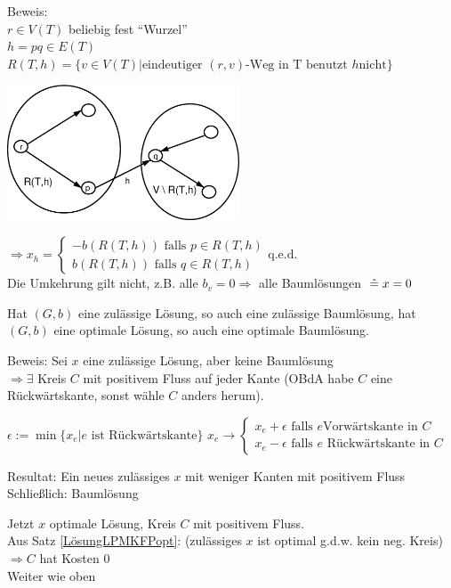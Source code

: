 Beweis:\\
$r \in V(T)$ beliebig fest "`Wurzel"'\\
$h=p q \in E(T)$\\
$R(T,h) = \{v \in V(T) | \mbox{eindeutiger $(r,v)$-Weg in T benutzt $h$
nicht}\}$

\includegraphics[height=4cm]{bilder/4-2BeweisL47}

$\Rightarrow x_{h} = \left\{\begin{array}{ll}-b(R(T,h)) \mbox{ falls } p
\in R(T,h)\\ b(R(T,h)) \mbox{ falls } q \in R(T,h)\end{array}\right.
\mbox{q.e.d.}$\\
Die Umkehrung gilt nicht, z.B. alle $b_{v} = 0 \Rightarrow$ alle
Baumlösungen $\; \hat{=}\; x=0$

\begin{satz}
Hat $(G,b)$ eine zulässige Lösung, so auch eine zulässige Baumlösung, hat
$(G,b)$ eine optimale Lösung, so auch eine optimale Baumlösung.
\end{satz}
Beweis: Sei $x$ eine zulässige Lösung, aber keine Baumlösung\\
$\Rightarrow \exists$ Kreis $C$ mit positivem Fluss auf jeder Kante (OBdA
habe $C$ eine Rückwärtskante, sonst wähle $C$ anders herum).

$\epsilon := \min \{x_{e} | e \mbox{ ist Rückwärtskante} \}$
$x_{e} \rightarrow \left\{ \begin{array}{ll} x_{e} + \epsilon \mbox{ falls $e$
Vorwärtskante in $C$}\\
x_{e}-\epsilon  \mbox{ falls $e$ Rückwärtskante in $C$} \end{array}
\right.$

Resultat: Ein neues zulässiges $x$ mit weniger Kanten mit positivem Fluss\\
Schließlich: Baumlösung

Jetzt $x$ optimale Lösung, Kreis $C$ mit positivem Fluss.\\
Aus Satz \ref{LösungLPMKFPopt}: (zulässiges $x$ ist optimal g.d.w. kein
neg. Kreis)
$\Rightarrow C$ hat Kosten 0\\
Weiter wie oben 


